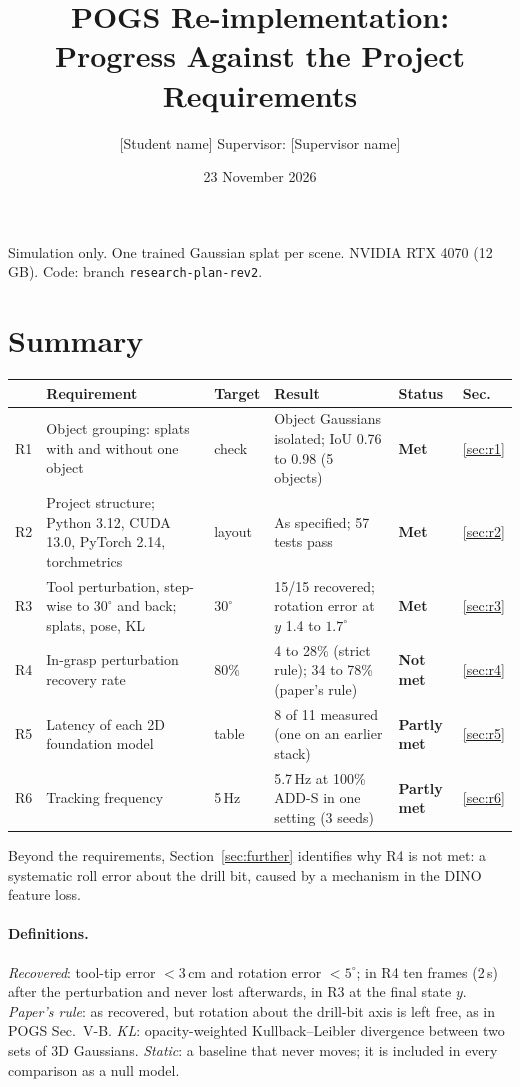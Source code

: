 \documentclass[10pt,a4paper]{article}
\title{\vspace{-1.2cm}POGS Re-implementation:\\Progress Against the Project Requirements}
\author{[Student name] \quad Supervisor: [Supervisor name]}
\date{23 November 2026}
\newcommand{\met}{\textcolor{good}{\textbf{Met}}}
\newcommand{\partmet}{\textcolor{warn}{\textbf{Partly met}}}
\newcommand{\notmet}{\textcolor{crit}{\textbf{Not met}}}
\begin{document}
\maketitle
\vspace{-0.6cm}

\begin{center}
\small Simulation only. One trained Gaussian splat per scene. NVIDIA RTX 4070 (12\,GB). Code: branch \texttt{research-plan-rev2}.
\end{center}

\section*{Summary}
\begin{table}[H]
\centering\small
\begin{tabularx}{\linewidth}{@{}l X l X l l@{}}
\toprule
& Requirement & Target & Result & Status & Sec.\\
\midrule
R1 & Object grouping: splats with and without one object & check & Object Gaussians isolated; IoU 0.76 to 0.98 (5 objects) & \met & \ref{sec:r1}\\
R2 & Project structure; Python 3.12, CUDA 13.0, PyTorch 2.14, torchmetrics & layout & As specified; 57 tests pass & \met & \ref{sec:r2}\\
R3 & Tool perturbation, step-wise to $30^\circ$ and back; splats, pose, KL & $30^\circ$ & 15/15 recovered; rotation error at $y$ 1.4 to $1.7^\circ$ & \met & \ref{sec:r3}\\
R4 & In-grasp perturbation recovery rate & 80\% & 4 to 28\% (strict rule); 34 to 78\% (paper's rule) & \notmet & \ref{sec:r4}\\
R5 & Latency of each 2D foundation model & table & 8 of 11 measured (one on an earlier stack) & \partmet & \ref{sec:r5}\\
R6 & Tracking frequency & 5\,Hz & 5.7\,Hz at 100\% ADD-S in one setting (3 seeds) & \partmet & \ref{sec:r6}\\
\bottomrule
\end{tabularx}
\end{table}

Beyond the requirements, Section~\ref{sec:further} identifies why R4 is not met: a systematic roll error about the drill bit, caused by a mechanism in the DINO feature loss.

\paragraph{Definitions.} \emph{Recovered}: tool-tip error $<3$\,cm and rotation error $<5^\circ$; in R4 ten frames (2\,s) after the perturbation and never lost afterwards, in R3 at the final state $y$. \emph{Paper's rule}: as recovered, but rotation about the drill-bit axis is left free, as in POGS Sec.~V-B. \emph{KL}: opacity-weighted Kullback--Leibler divergence between two sets of 3D Gaussians. \emph{Static}: a baseline that never moves; it is included in every comparison as a null model.
\end{document}
